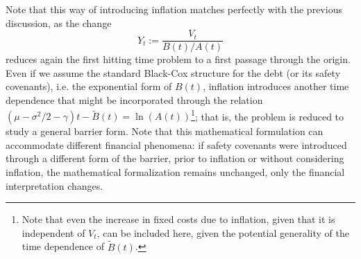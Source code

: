 \documentclass[12pt]{article}
\theoremstyle{definition}
\begin{document}
Note that this way of introducing inflation matches perfectly with the previous discussion, as the change
$$
Y_t := \frac{V_t}{B(t)/A(t)}
$$
reduces again the first hitting time problem to a first passage through the origin. Even if we assume the standard Black-Cox structure for the debt (or its safety covenants), i.e. the exponential form of $B(t)$, inflation introduces another time dependence that might be incorporated through the relation $(\mu-\sigma^2/2-\gamma)t-\tilde{B}(t)=\ln(A(t))$\footnote{Note that even the increase in fixed costs due to inflation, given that it is independent of $V_t$, can be included here, given the potential generality of the time dependence of $\tilde{B}(t)$.}; that is, the problem is reduced to study a general barrier form. Note that this mathematical formulation can accommodate different financial phenomena: if safety covenants were introduced through a different form of the barrier, prior to inflation or without considering inflation, the mathematical formalization remains unchanged, only the financial interpretation changes.




\end{document}
